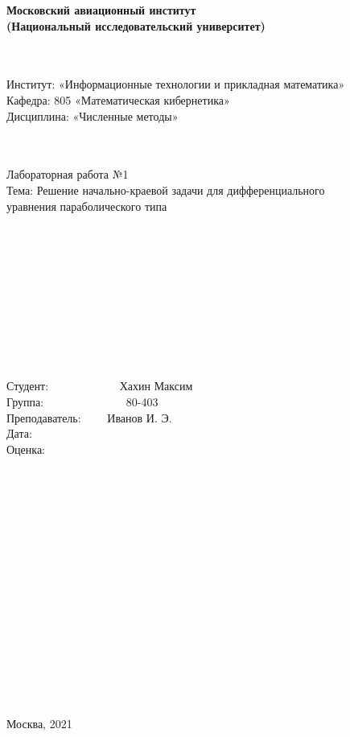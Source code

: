 \documentclass[12pt]{article}
\begin{document}
    \begin{center}
        \textbf{Московский авиационный институт} \\
        \textbf{(Национальный исследовательский университет)}
    \end{center} 
    ~\\
    ~\\
    Институт: «Информационные технологии и прикладная математика» \\
    Кафедра: 805 «Математическая кибернетика»  \\
    Дисциплина: «Численные методы»  
    ~\\
    ~\\
    ~\\
    \begin{center}
        Лабораторная работа №1 \\
        Тема: Решение начально-краевой задачи для дифференциального\\ уравнения 
        параболического типа
    \end{center}
    ~\\
    ~\\
    ~\\
    ~\\
    ~\\
    ~\\
    ~\\
    ~\\
    ~\\
    \begin{flushright}
        Студент: ~~~~~~~~~~~~Хахин Максим~~~~~~\\
        Группа: ~~~~~~~~~~~~~~80-403~~~~~~~~~~~~~~~~~\\
        Преподаватель: ~~~~Иванов И. Э.~~~~~~~\\
        Дата: ~~~~~~~~~~~~~~~~~~~~~~~~~~~~~~~~~~~~~~~~~~~\\
        Оценка: ~~~~~~~~~~~~~~~~~~~~~~~~~~~~~~~~~~~~~~~~\\
    \end{flushright}
    ~\\
    ~\\
    ~\\
    ~\\
    ~\\
    ~\\
    ~\\
    ~\\
    ~\\
    ~\\
    ~\\
    ~\\
    ~\\
    ~\\
    ~\\
    \begin{center}
        Москва, 2021
    \end{center}
    \pagestyle{empty}
    \newpage
\end{document}
